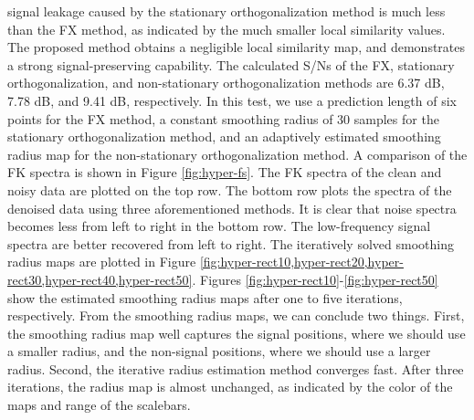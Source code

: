signal leakage caused by the stationary orthogonalization method is much less than the FX method, as indicated by the much smaller local similarity values. The proposed method obtains a negligible local similarity map, and demonstrates a strong signal-preserving capability. The calculated S/Ns of the FX, stationary orthogonalization, and non-stationary orthogonalization methods are 6.37 dB, 7.78 dB, and 9.41 dB, respectively. In this test, we use a prediction length of six points for the FX method, a constant smoothing radius of 30 samples for the stationary orthogonalization method, and an adaptively estimated smoothing radius map for the non-stationary orthogonalization method. A comparison of the FK spectra is shown in Figure \ref{fig:hyper-fs}. The FK spectra of the clean and noisy data are plotted on the top row. The bottom row plots the spectra of the denoised data using three aforementioned methods. It is clear that noise spectra becomes less from left to right in the bottom row. The low-frequency signal spectra are better recovered from left to right. The iteratively solved smoothing radius maps are plotted in Figure \ref{fig:hyper-rect10,hyper-rect20,hyper-rect30,hyper-rect40,hyper-rect50}. Figures \ref{fig:hyper-rect10}-\ref{fig:hyper-rect50} show the estimated smoothing radius maps after one to five iterations, respectively. From the smoothing radius maps, we can conclude two things. First, the smoothing radius map well captures the signal positions, where we should use a smaller radius, and the non-signal positions, where we should use a larger radius. Second, the iterative radius estimation method converges fast. After three iterations, the radius map is almost unchanged, as indicated by the color of the maps and range of the scalebars. 

